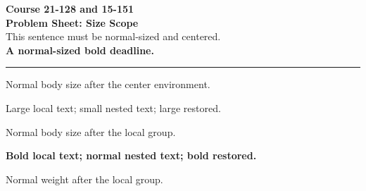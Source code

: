 \documentclass[11pt]{article}
\begin{document}
\pagestyle{empty}
\begin{center}
{\Large\bfseries Course 21-128 and 15-151}\\[3pt]
{\small\bfseries Problem Sheet: Size Scope}\\[7pt]
This sentence must be normal-sized and centered.\\[2pt]
\textbf{A normal-sized bold deadline.}
\end{center}
\hrule
\vspace{0.6em}
Normal body size after the center environment.

{\Large Large local text; {\small small nested text;} large restored.}

Normal body size after the local group.

{\bfseries Bold local text; {\normalfont normal nested text;} bold restored.}

Normal weight after the local group.
\end{document}
